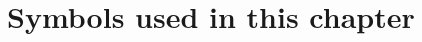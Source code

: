 \begin{comment}
MBA 11 alum Matthew Cedergren
supplies these
links to interactive graphs of Cobb-Douglas production functions:
%
\begin{itemize}
\item  Manfred Gartner's
\href{http://www.fgn.unisg.ch/eurmacro/tutor/cobb-douglas.html}
{eurmacro site}.

\item
\href{http://demonstrations.wolfram.com/CobbDouglasProductionFunctions/}
{Wolfram demonstrations}.

\end{itemize}
\end{comment}


\section*{Symbols used in this chapter}


